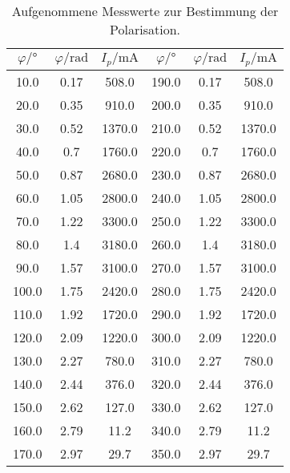\begin{table}[htb]
\begin{tabular}{cccccc}
\toprule
$\varphi / \si{\degree}$ & $\varphi / \si{\radian}$ & $I_p / \si{\milli\ampere}$ & $\varphi / \si{\degree}$ & $\varphi / \si{\radian}$ & $I_p / \si{\milli\ampere}$ \\
\midrule
10.0 & 0.17 & 508.0 & 190.0 & 0.17 & 508.0 \\
20.0 & 0.35 & 910.0 & 200.0 & 0.35 & 910.0 \\
30.0 & 0.52 & 1370.0 & 210.0 & 0.52 & 1370.0 \\
40.0 & 0.7 & 1760.0 & 220.0 & 0.7 & 1760.0 \\
50.0 & 0.87 & 2680.0 & 230.0 & 0.87 & 2680.0 \\
60.0 & 1.05 & 2800.0 & 240.0 & 1.05 & 2800.0 \\
70.0 & 1.22 & 3300.0 & 250.0 & 1.22 & 3300.0 \\
80.0 & 1.4 & 3180.0 & 260.0 & 1.4 & 3180.0 \\
90.0 & 1.57 & 3100.0 & 270.0 & 1.57 & 3100.0 \\
100.0 & 1.75 & 2420.0 & 280.0 & 1.75 & 2420.0 \\
110.0 & 1.92 & 1720.0 & 290.0 & 1.92 & 1720.0 \\
120.0 & 2.09 & 1220.0 & 300.0 & 2.09 & 1220.0 \\
130.0 & 2.27 & 780.0 & 310.0 & 2.27 & 780.0 \\
140.0 & 2.44 & 376.0 & 320.0 & 2.44 & 376.0 \\
150.0 & 2.62 & 127.0 & 330.0 & 2.62 & 127.0 \\
160.0 & 2.79 & 11.2 & 340.0 & 2.79 & 11.2 \\
170.0 & 2.97 & 29.7 & 350.0 & 2.97 & 29.7 \\
\end{tabular}
\caption{Aufgenommene Messwerte zur Bestimmung der Polarisation.}
\label{tab:pol}
\end{table}
